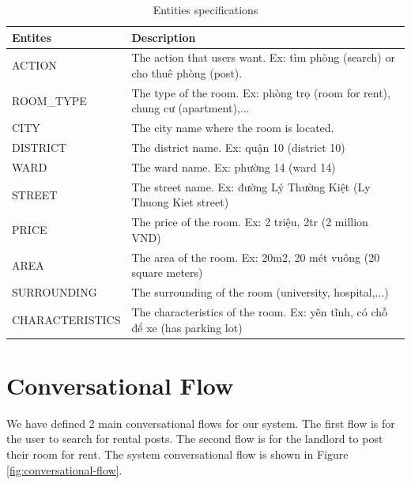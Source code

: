 {\renewcommand{\arraystretch}{1.75}%
\begin{table}[ht]
    \centering
    \begin{tabular}{|l|l|}
        \hline
        \textbf{Entites} & \textbf{Description} \\ \hline
        ACTION & The action that users want. Ex: tìm phòng (search) or cho thuê phòng (post). \\ \hline
        ROOM\_TYPE & The type of the room. Ex: phòng trọ (room for rent), chung cư (apartment),... \\ \hline
        CITY & The city name where the room is located. \\ \hline
        DISTRICT & The district name. Ex: quận 10 (district 10) \\ \hline
        WARD & The ward name. Ex: phường 14 (ward 14) \\ \hline
        STREET & The street name. Ex: đường Lý Thường Kiệt (Ly Thuong Kiet street)\\ \hline
        PRICE & The price of the room. Ex: 2 triệu, 2tr (2 million VND) \\ \hline
        AREA & The area of the room. Ex: 20m2, 20 mét vuông (20 square meters) \\ \hline
        SURROUNDING & The surrounding of the room (university, hospital,...)\\ \hline
        CHARACTERISTICS & The characteristics of the room. Ex: yên tĩnh, có chỗ để xe (has parking lot) \\ \hline

    \end{tabular}
    \caption{Entities specifications}
    \label{tab:entities-specifications}
\end{table}}
\clearpage

\section{Conversational Flow}

We have defined 2 main conversational flows for our system. The first flow is for the user to search for rental posts. The second flow is for the landlord to post their room for rent. The system conversational flow is shown in Figure \ref{fig:conversational-flow}.

